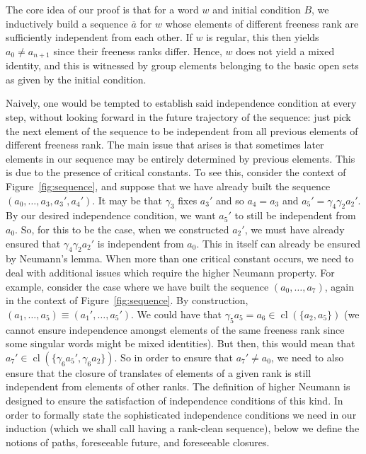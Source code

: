 \documentclass{article}
\theoremstyle{remark}
\theoremstyle{definition}
\DeclareMathOperator{\cl}{cl}
\begin{document}
{The core idea of our proof is that for a  %
{word}  $w$ and initial condition $B$, we inductively build a sequence $\overline{a}$ for $w$ whose  elements of different freeness rank are sufficiently independent from each other. If $w$ is regular, this then yields $a_0\neq a_{n+1}$ since their freeness ranks differ. Hence,  $w$ does not yield a mixed identity, and this is witnessed by group elements belonging to the basic open sets as given by the initial condition. 

Naively, one would be tempted to establish said independence condition  at every step, without looking forward in the future trajectory of the sequence: just pick the next element of the sequence to be  independent from all previous elements of different freeness rank. 
The main issue that arises is that sometimes later elements in our sequence may be entirely determined by previous elements. This is  due to the presence of critical constants.  To see this, consider the context of Figure~\ref{fig:sequence}, and suppose that we have already built the sequence $(a_0, \dots, a_3, a_3', a_4')$. It may be that $\gamma_3$ fixes $a_3'$ and so $a_4=a_3$ and $a_5'=\gamma_4\gamma_2 a_2'$. By our desired independence condition, we want $a_5'$ to still be independent from $a_0$. So, for this to be the case, when we constructed $a_2'$, we must have already ensured that $\gamma_4\gamma_2 a_2'$ is independent from $a_0$. This in itself can already be ensured by Neumann's lemma. When more than one critical constant occurs, we need to deal with additional issues which require the higher Neumann property. For example, consider the case where we have built the sequence $(a_0, \dots, a_7)$, again in the context of Figure~\ref{fig:sequence}. By construction, $(a_1, \dots, a_5)\equiv (a_1',\dots, a_5')$. We could have that $\gamma_5 a_5=a_6\in {\cl}(\{a_2,  a_5\})$ (we cannot ensure independence amongst elements of the same freeness rank since  some singular words might be mixed identities). But then, this would mean that $a_7'\in {\cl}(\{\gamma_6 a_5',\gamma_6 a_2\})$. So in order to ensure that $a_7'\neq a_0$, we need to also ensure that the %
{closure} of translates of elements of a given rank is still independent from elements of other ranks. The definition of higher Neumann is designed to ensure the satisfaction of independence conditions of this kind. In order to formally state the sophisticated independence conditions we need in our induction (which we shall call having a rank-clean sequence), below we define the notions of paths, foreseeable future, and foreseeable closures.



}
\end{document}
